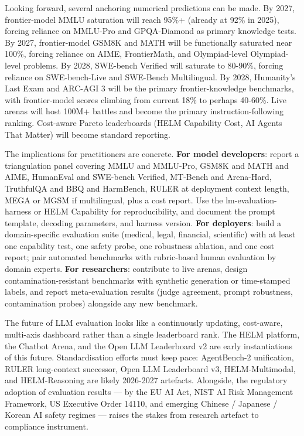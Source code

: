 \documentclass{article}
\begin{document}
Looking forward, several anchoring numerical predictions can be made. By 2027, frontier-model MMLU saturation will reach 95\%+ (already at 92\% in 2025), forcing reliance on MMLU-Pro and GPQA-Diamond as primary knowledge tests. By 2027, frontier-model GSM8K and MATH will be functionally saturated near 100\%, forcing reliance on AIME, FrontierMath, and Olympiad-level Olympiad-level problems. By 2028, SWE-bench Verified will saturate to 80-90\%, forcing reliance on SWE-bench-Live and SWE-Bench Multilingual. By 2028, Humanity's Last Exam and ARC-AGI 3 will be the primary frontier-knowledge benchmarks, with frontier-model scores climbing from current 18\% to perhaps 40-60\%. Live arenas will host 100M+ battles and become the primary instruction-following ranking. Cost-aware Pareto leaderboards (HELM Capability Cost, AI Agents That Matter) will become standard reporting.

The implications for practitioners are concrete. \textbf{For model developers}: report a triangulation panel covering MMLU and MMLU-Pro, GSM8K and MATH and AIME, HumanEval and SWE-bench Verified, MT-Bench and Arena-Hard, TruthfulQA and BBQ and HarmBench, RULER at deployment context length, MEGA or MGSM if multilingual, plus a cost report. Use the lm-evaluation-harness or HELM Capability for reproducibility, and document the prompt template, decoding parameters, and harness version. \textbf{For deployers}: build a domain-specific evaluation suite (medical, legal, financial, scientific) with at least one capability test, one safety probe, one robustness ablation, and one cost report; pair automated benchmarks with rubric-based human evaluation by domain experts. \textbf{For researchers}: contribute to live arenas, design contamination-resistant benchmarks with synthetic generation or time-stamped labels, and report meta-evaluation results (judge agreement, prompt robustness, contamination probes) alongside any new benchmark.

The future of LLM evaluation looks like a continuously updating, cost-aware, multi-axis dashboard rather than a single leaderboard rank. The HELM platform, the Chatbot Arena, and the Open LLM Leaderboard v2 are early instantiations of this future. Standardisation efforts must keep pace: AgentBench-2 unification, RULER long-context successor, Open LLM Leaderboard v3, HELM-Multimodal, and HELM-Reasoning are likely 2026-2027 artefacts. Alongside, the regulatory adoption of evaluation results --- by the EU AI Act, NIST AI Risk Management Framework, US Executive Order 14110, and emerging Chinese / Japanese / Korean AI safety regimes --- raises the stakes from research artefact to compliance instrument.
\end{document}
